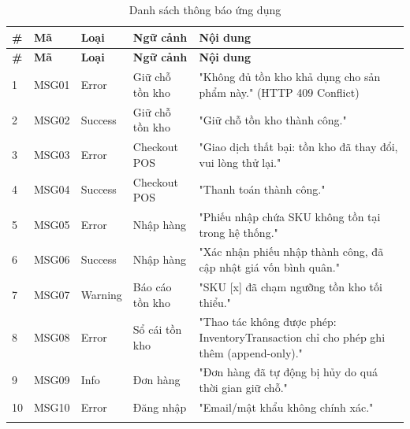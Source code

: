 \begin{longtable}{|p{0.6cm}|p{1.6cm}|p{1.5cm}|p{3cm}|p{6.5cm}|}
    \hline
    \textbf{\#} & \textbf{Mã} & \textbf{Loại} & \textbf{Ngữ cảnh} &
    \textbf{Nội dung} \\
    \hline
    \endfirsthead
    \hline
    \textbf{\#} & \textbf{Mã} & \textbf{Loại} & \textbf{Ngữ cảnh} &
    \textbf{Nội dung} \\
    \hline
    \endhead
    1 & MSG01 & Error & Giữ chỗ tồn kho & "Không đủ tồn kho khả dụng cho sản phẩm này." (HTTP 409 Conflict) \\
    \hline
    2 & MSG02 & Success & Giữ chỗ tồn kho & "Giữ chỗ tồn kho thành công." \\
    \hline
    3 & MSG03 & Error & Checkout POS & "Giao dịch thất bại: tồn kho đã thay đổi, vui lòng thử lại." \\
    \hline
    4 & MSG04 & Success & Checkout POS & "Thanh toán thành công." \\
    \hline
    5 & MSG05 & Error & Nhập hàng & "Phiếu nhập chứa SKU không tồn tại trong hệ thống." \\
    \hline
    6 & MSG06 & Success & Nhập hàng & "Xác nhận phiếu nhập thành công, đã cập nhật giá vốn bình quân." \\
    \hline
    7 & MSG07 & Warning & Báo cáo tồn kho & "SKU [x] đã chạm ngưỡng tồn kho tối thiểu." \\
    \hline
    8 & MSG08 & Error & Sổ cái tồn kho & "Thao tác không được phép: InventoryTransaction chỉ cho phép ghi thêm (append-only)." \\
    \hline
    9 & MSG09 & Info & Đơn hàng & "Đơn hàng đã tự động bị hủy do quá thời gian giữ chỗ." \\
    \hline
    10 & MSG10 & Error & Đăng nhập & "Email/mật khẩu không chính xác." \\
    \hline
    \caption{Danh sách thông báo ứng dụng}
    \label{tab:app-messages}
\end{longtable}
